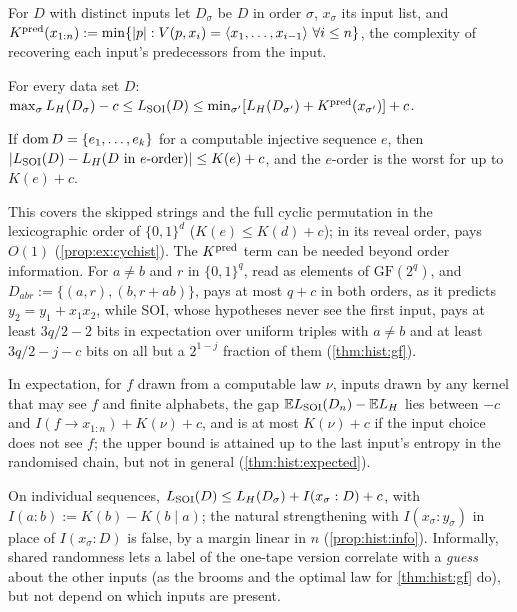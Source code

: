 For $D$ with distinct inputs let $D_\sigma$ be $D$ in order $\sigma$, $x_\sigma$ its input list, and $K^{\mathrm{pred}}(x_{1:n}):=\min\{|p|:V(p,x_i)=\langle x_1,\dots,x_{i-1}\rangle\ \forall i\le n\}$, the complexity of recovering each input's predecessors from the input.

\begin{theorem}[Sandwich]\label{thm:hist:sandwich}
For every data set $D$: $\max_\sigma L_{H}(D_\sigma)-c\le L_{\mathrm{SOI}}(D)\le\min_{\sigma'}[L_{H}(D_{\sigma'})+K^{\mathrm{pred}}(x_{\sigma'})]+c$.
\end{theorem}

\begin{corollary}\label{cor:hist:initial}
If $\operatorname{dom} D=\{e_1,\dots,e_k\}$ for a computable injective sequence $e$, then $|L_{\mathrm{SOI}}(D)-L_{H}(D\text{ in $e$-order})|\le K(e)+c$, and the $e$-order is the worst for \SFIhist{} up to $K(e)+c$.
\end{corollary}

This covers the skipped strings and the full cyclic permutation in the lexicographic order of $\{0,1\}^d$ ($K(e)\le K(d)+c$); in its reveal order, \SFIhist{} pays $O(1)$ (\cref{prop:ex:cychist}). The $K^{\mathrm{pred}}$ term can be needed beyond order information. For $a\ne b$ and $r$ in $\{0,1\}^q$, read as elements of $\mathrm{GF}(2^q)$, and $D_{abr}:=\{(a,r),(b,r+ab)\}$, \SFIhist{} pays at most $q+c$ in both orders, as it predicts $y_2=y_1+x_1x_2$, while SOI, whose hypotheses never see the first input, pays at least $3q/2-2$ bits in expectation over uniform triples with $a\ne b$ and at least $3q/2-j-c$ bits on all but a $2^{1-j}$ fraction of them (\cref{thm:hist:gf}).

In expectation, for $f$ drawn from a computable law $\nu$, inputs drawn by any kernel that may see $f$ and finite alphabets, the gap $\mathbb{E}L_{\mathrm{SOI}}(D_n)-\mathbb{E}L_{H}$ lies between $-c$ and $I(f\to x_{1:n})+K(\nu)+c$, and is at most $K(\nu)+c$ if the input choice does not see $f$; the upper bound is attained up to the last input's entropy in the randomised chain, but not in general (\cref{thm:hist:expected}).

On individual sequences, $L_{\mathrm{SOI}}(D)\le L_{H}(D_\sigma)+I(x_\sigma:D)+c$, with $I(a:b):=K(b)-K(b\mid a)$; the natural strengthening with $I(x_\sigma:y_\sigma)$ in place of $I(x_\sigma:D)$ is false, by a margin linear in $n$ (\cref{prop:hist:info}). Informally, shared randomness lets a label of the one-tape version correlate with a \emph{guess} about the other inputs (as the brooms and the optimal law for \cref{thm:hist:gf} do), but not depend on which inputs are present.

